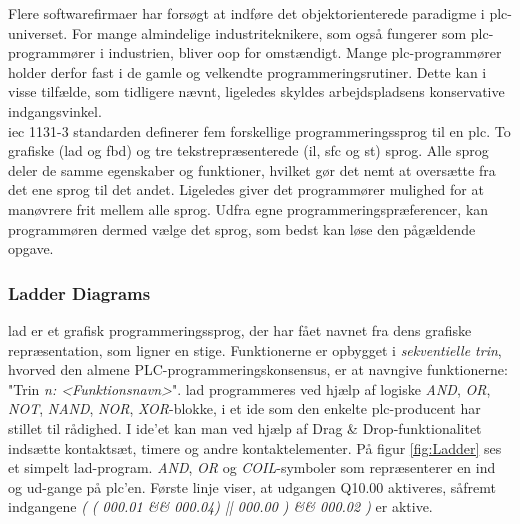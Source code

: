 \noindent Flere softwarefirmaer har forsøgt at indføre det objektorienterede paradigme i \gls{plc}-universet. For mange almindelige industriteknikere, som også fungerer som \gls{plc}-programmører i industrien, bliver \gls{oop} for omstændigt. 
Mange \gls{plc}-programmører holder derfor fast i de gamle og velkendte programmeringsrutiner. Dette kan i visse tilfælde, som tidligere nævnt, ligeledes skyldes arbejdspladsens konservative indgangsvinkel\cite{PLC_Siemens_OOP}.  \\

\noindent \gls{iec} 1131-3 standarden definerer fem forskellige programmeringssprog til en \gls{plc}. To grafiske (\gls{lad} og \gls{fbd}) og tre tekstrepræsenterede (\gls{il}, \gls{sfc} og \gls{st}) sprog. Alle sprog deler de samme egenskaber og funktioner, hvilket gør det nemt at oversætte fra det ene sprog til det andet. Ligeledes giver det programmører mulighed for at manøvrere frit mellem alle sprog. Udfra egne programmeringspræferencer, kan programmøren dermed vælge det sprog, som bedst kan løse den pågældende opgave.

\subsubsection{Ladder Diagrams}
\gls{lad} er et grafisk programmeringssprog, der har fået navnet fra dens grafiske repræsentation, som ligner en stige. Funktionerne er opbygget i \textit{sekventielle trin}, hvorved den almene PLC-programmeringskonsensus, er at navngive funktionerne: "Trin \textit{n: <Funktionsnavn>}". 
\gls{lad} programmeres ved hjælp af logiske \textit{AND}, \textit{OR}, \textit{NOT}, \textit{NAND}, \textit{NOR}, \textit{XOR}-blokke, i et \gls{ide} som den enkelte \gls{plc}-producent har stillet til rådighed. I \gls{ide}'et kan man ved hjælp af Drag \& Drop-funktionalitet indsætte kontaktsæt, timere og andre kontaktelementer. På figur \ref{fig:Ladder} ses et simpelt \gls{lad}-program. \textit{AND}, \textit{OR} og \textit{COIL}-symboler som repræsenterer en ind og ud-gange på \gls{plc}'en. Første linje viser, at udgangen Q10.00 aktiveres, såfremt indgangene \textit{( ( 000.01 \&\& 000.04) || 000.00 ) \&\& 000.02 )} er aktive.


